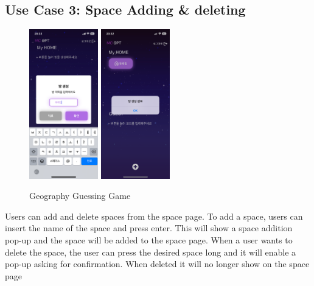 \documentclass[conference]{IEEEtran}
\begin{document}
    \subsection{Use Case 3: Space Adding \& deleting}
        \begin{figure}[htbp]
            \centerline{\includegraphics[width=3cm]{Images/screen/space/3_SPACE_POPUP1_FILLED.PNG}
            \includegraphics[width=3cm]{Images/screen/space/4_SPACE_CREATE_ALERT.PNG}}
            \caption{Geography Guessing Game}
            \label{fig}
        \end{figure}
        Users can add and delete spaces from the space page. To add a space, users can insert the name of the space and press enter. This will show a space addition pop-up and the space will be added to the space page. When a user wants to delete the space, the user can press the desired space long and it will enable a pop-up asking for confirmation. When deleted it will no longer show on the space page\\
\end{document}
